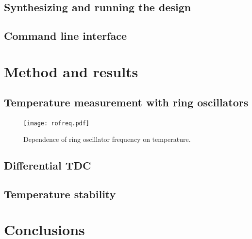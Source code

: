 \documentclass[a4paper,11pt]{article}
\begin{document}
\subsection{Synthesizing and running the design}

\subsection{Command line interface}

\section{Method and results}

\subsection{Temperature measurement with ring oscillators}

\begin{figure}[h]
\texttt{[image: rofreq.pdf]}
\caption{Dependence of ring oscillator frequency on temperature.}
\label{fig:rofreq}
\end{figure}

\subsection{Differential TDC}

\subsection{Temperature stability}

\section{Conclusions}
\end{document}

